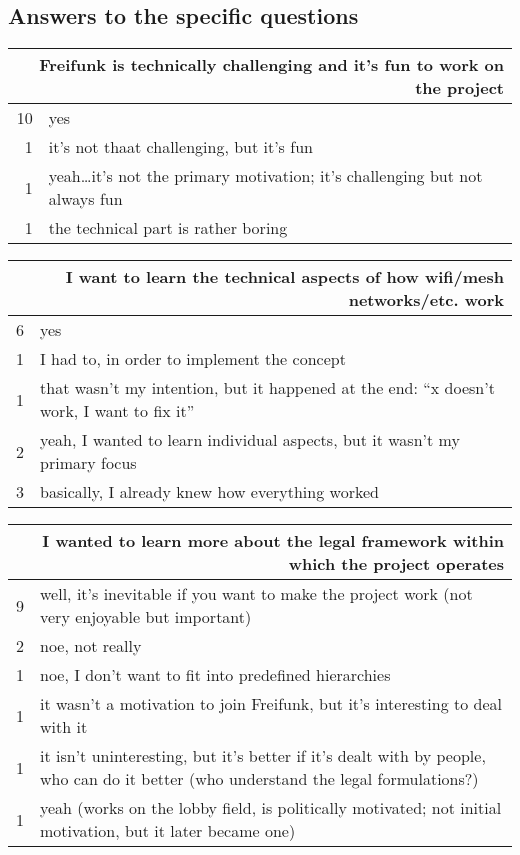 \subsection{Answers to the specific questions}

\begin{table}[h]
  \begin{tabular}{| r | p{\textwidth} |}
    \hline
    \multicolumn{2}{|p{\textwidth}|}{Freifunk is technically challenging and it's fun to work on the project} \\
    \hline
    10 & yes \\
    1  & it's not thaat challenging, but it's fun \\
    1  & yeah\ldots it's not the primary motivation; it's challenging but not always fun \\
    1  & the technical part is rather boring \\
    \hline
  \end{tabular}
\end{table}

\begin{table}[h]
  \begin{tabular}{| r | p{\textwidth} |}
    \hline
    \multicolumn{2}{|p{\textwidth}|}{I want to learn the technical aspects of how wifi/mesh networks/etc. work} \\
    \hline
    6 & yes \\
    1 & I had to, in order to implement the concept \\
    1 & that wasn't my intention, but it happened at the end: ``x doesn't work, I want to fix it'' \\
    2 & yeah, I wanted to learn individual aspects, but it wasn't my primary focus \\
    3 & basically, I already knew how everything worked \\
    \hline
  \end{tabular}
\end{table}

\begin{table}[h]
  \begin{tabular}{| r | p{\textwidth} |}
    \hline
    \multicolumn{2}{|p{\textwidth}|}{I wanted to learn more about the legal framework within which the project operates} \\
    \hline
    9 & well, it's inevitable if you want to make the project work (not very enjoyable but important) \\
    2 & noe, not really \\
    1 & noe, I don't want to fit into predefined hierarchies \\
    1 & it wasn't a motivation to join Freifunk, but it's interesting to deal with it \\
    1 & it isn't uninteresting, but it's better if it's dealt with by people, who can do it better (who understand the legal formulations?) \\
    1 & yeah (works on the lobby field, is politically motivated; not initial motivation, but it later became one) \\
    \hline
  \end{tabular}
\end{table}

